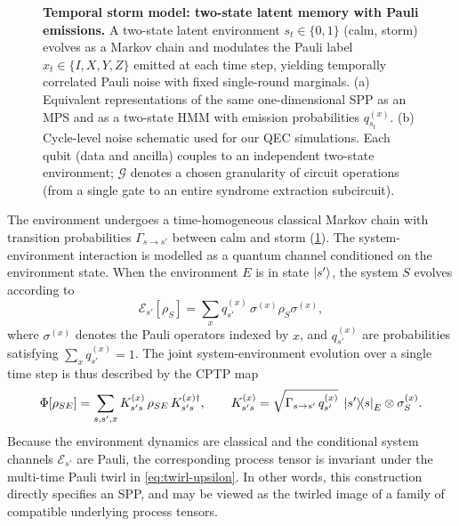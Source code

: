 \begin{figure}[t]
    \centering
    \begin{subfigure}[b]{0.49\textwidth}
      \centering
      \valignboxnopad{}
      \caption{}
    \end{subfigure}
    \begin{subfigure}[b]{0.49\textwidth}
      \centering
      \valignboxnopad{}
      \caption{}
    \end{subfigure}
    \caption{\textbf{Temporal storm model: two-state latent memory with Pauli emissions.} A two-state latent environment \(s_t \in \{0,1\}\) (calm, storm) evolves as a Markov chain and modulates the Pauli label \(x_t \in \{I, X, Y, Z\}\) emitted at each time step, yielding temporally correlated Pauli noise with fixed single-round marginals. (a) Equivalent representations of the same one-dimensional SPP as an MPS and as a two-state HMM with emission probabilities \(q_{s_t}^{(x)}\). (b) Cycle-level noise schematic used for our QEC simulations. Each qubit (data and ancilla) couples to an independent two-state environment; \(\mathcal{G}\) denotes a chosen granularity of circuit operations (from a single gate to an entire syndrome extraction subcircuit).}
    \label{fig:temporal-storm-overview}
\end{figure}

The environment undergoes a time-homogeneous classical Markov chain with transition probabilities \(\Gamma_{s\to s'}\) between calm and storm (\cref{fig:temporal-storm-overview}). The system-environment interaction is modelled as a quantum channel conditioned on the environment state. When the environment \(E\) is in state \(\ket{s'}\), the system \(S\) evolves according to
\begin{equation}
    \mathcal{E}_{s'}[\rho_S]
    = \sum_x q^{(x)}_{s'} \,\sigma^{(x)} \rho_S \sigma^{(x)},
\end{equation}
where \(\sigma^{(x)}\) denotes the Pauli operators indexed by \(x\), and \(q^{(x)}_{s'}\) are probabilities satisfying \(\sum_x q^{(x)}_{s'} = 1\). The joint system-environment evolution over a single time step is thus described by the CPTP map
\begin{equation}
    \Phi[\rho_{SE}]
    = \sum_{s,s',x} K^{(x)}_{s's} \,\rho_{SE}\, K^{(x)\dagger}_{s's},
    \qquad
    K^{(x)}_{s's}
    = \sqrt{\Gamma_{s\to s'}\,q^{(x)}_{s'}}\;
      \ket{s'}\!\!\bra{s}_E \otimes \sigma^{(x)}_S.
\end{equation}
Because the environment dynamics are classical and the conditional system channels \(\mathcal{E}_{s'}\) are Pauli, the corresponding process tensor is invariant under the multi-time Pauli twirl in \cref{eq:twirl-upsilon}. In other words, this construction directly specifies an SPP, and may be viewed as the twirled image of a family of compatible underlying process tensors.


